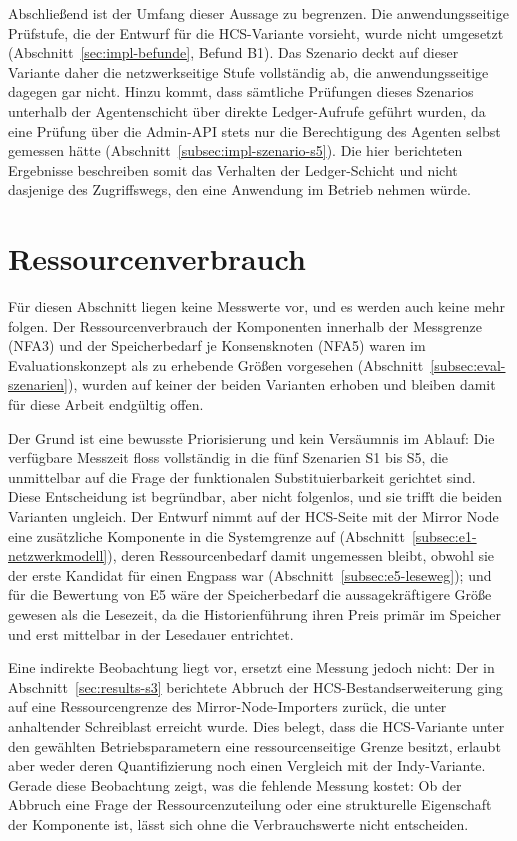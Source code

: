 Abschließend ist der Umfang dieser Aussage zu begrenzen. Die anwendungsseitige Prüfstufe, die der Entwurf für die HCS-Variante vorsieht, wurde nicht umgesetzt (Abschnitt~\ref{sec:impl-befunde}, Befund B1). Das Szenario deckt auf dieser Variante daher die netzwerkseitige Stufe vollständig ab, die anwendungsseitige dagegen gar nicht. Hinzu kommt, dass sämtliche Prüfungen dieses Szenarios unterhalb der Agentenschicht über direkte Ledger-Aufrufe geführt wurden, da eine Prüfung über die Admin-API stets nur die Berechtigung des Agenten selbst gemessen hätte (Abschnitt~\ref{subsec:impl-szenario-s5}). Die hier berichteten Ergebnisse beschreiben somit das Verhalten der Ledger-Schicht und nicht dasjenige des Zugriffswegs, den eine Anwendung im Betrieb nehmen würde.

\section{Ressourcenverbrauch}
\label{sec:results-ressourcen}

Für diesen Abschnitt liegen keine Messwerte vor, und es werden auch keine mehr folgen. Der Ressourcenverbrauch der Komponenten innerhalb der Messgrenze (NFA3) und der Speicherbedarf je Konsensknoten (NFA5) waren im Evaluationskonzept als zu erhebende Größen vorgesehen (Abschnitt~\ref{subsec:eval-szenarien}), wurden auf keiner der beiden Varianten erhoben und bleiben damit für diese Arbeit endgültig offen.

Der Grund ist eine bewusste Priorisierung und kein Versäumnis im Ablauf: Die verfügbare Messzeit floss vollständig in die fünf Szenarien S1 bis S5, die unmittelbar auf die Frage der funktionalen Substituierbarkeit gerichtet sind. Diese Entscheidung ist begründbar, aber nicht folgenlos, und sie trifft die beiden Varianten ungleich. Der Entwurf nimmt auf der HCS-Seite mit der Mirror Node eine zusätzliche Komponente in die Systemgrenze auf (Abschnitt~\ref{subsec:e1-netzwerkmodell}), deren Ressourcenbedarf damit ungemessen bleibt, obwohl sie der erste Kandidat für einen Engpass war (Abschnitt~\ref{subsec:e5-leseweg}); und für die Bewertung von E5 wäre der Speicherbedarf die aussagekräftigere Größe gewesen als die Lesezeit, da die Historienführung ihren Preis primär im Speicher und erst mittelbar in der Lesedauer entrichtet.

Eine indirekte Beobachtung liegt vor, ersetzt eine Messung jedoch nicht: Der in Abschnitt~\ref{sec:results-s3} berichtete Abbruch der HCS-Bestandserweiterung ging auf eine Ressourcengrenze des Mirror-Node-Importers zurück, die unter anhaltender Schreiblast erreicht wurde. Dies belegt, dass die HCS-Variante unter den gewählten Betriebsparametern eine ressourcenseitige Grenze besitzt, erlaubt aber weder deren Quantifizierung noch einen Vergleich mit der Indy-Variante. Gerade diese Beobachtung zeigt, was die fehlende Messung kostet: Ob der Abbruch eine Frage der Ressourcenzuteilung oder eine strukturelle Eigenschaft der Komponente ist, lässt sich ohne die Verbrauchswerte nicht entscheiden.

